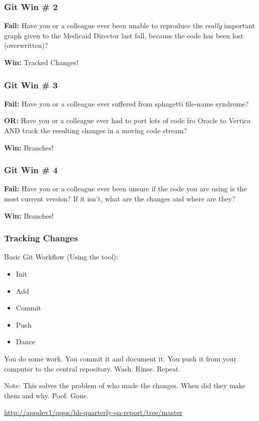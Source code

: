 \documentclass{beamer}
\begin{document}
\begin{frame}
  \frametitle{Git Win \# 2} 

  \textbf{Fail:} Have you or a colleague ever been unable to reproduce
  the \emph{really} important graph given to the Medicaid Director
  last fall, because the code has been lost (overwritten)?

  \bigskip 

  \textbf{Win:} Tracked Changes!

\end{frame}
 
\begin{frame}
  \frametitle{Git Win \# 3}

  \textbf{Fail:} Have you or a colleague ever suffered from sphagetti
  file-name syndrome?

  \textbf{OR:} Have you or a colleague ever had to port lots of code
  fro Oracle to Vertica AND track the resulting changes in a moving
  code stream?

  \bigskip 

  \textbf{Win:} Branches!

\end{frame}
 
\begin{frame}
  \frametitle{Git Win \# 4} 

  \textbf{Fail:} Have you or a colleague ever been unsure if the code
  you are using is the most current version? If it isn't, what are the
  changes and where are they?
  
  \bigskip 

  \textbf{Win:} Branches!

\end{frame}
 

\begin{frame} %
  \frametitle{Tracking Changes}
 
  Basic Git Workflow (Using the tool):
  \bigskip
 
  \begin{itemize}
  \item Init
  \item Add
  \item Commit
  \item Push
  \item Dance
  \end{itemize}
 
  \bigskip
  You do some work. You commit it and document it. You push it from
  your computer to the central repository. Wash. Rinse. Repeat.
 
  Note: This solves the problem of who made the changes. When did they make
  them and why. Poof. Gone.
  
  {\tiny {\url{http://appdev1/oqps/hh-quarterly-qa-report/tree/master}}}
  
\end{frame}
\end{document}
